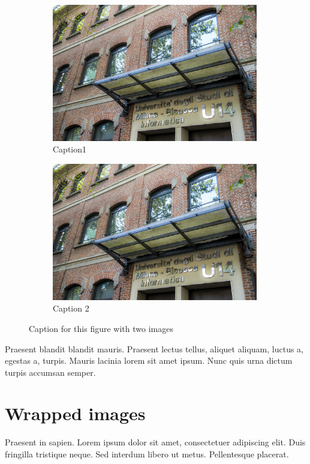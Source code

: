 \documentclass[a4paper, oneside]{book}
\begin{document}
\begin{figure}[h]
\begin{subfigure}{0.5\textwidth}
\includegraphics[width=0.9\linewidth, height=6cm]{u14} 
\caption{Caption1}
\label{fig:subim1}
\end{subfigure}
\begin{subfigure}{0.5\textwidth}
\includegraphics[width=0.9\linewidth, height=6cm]{u14}
\caption{Caption 2}
\label{fig:subim2}
\end{subfigure}

\caption{Caption for this figure with two images}
\label{fig:image2}
\end{figure}

Praesent blandit blandit mauris. Praesent lectus tellus, aliquet aliquam, luctus a, egestas a, turpis. Mauris lacinia lorem sit amet ipsum. Nunc quis urna dictum turpis accumsan semper.

\section{Wrapped images}

Praesent in sapien. Lorem ipsum dolor sit amet, consectetuer 
adipiscing elit. Duis fringilla tristique neque. Sed interdum 
libero ut metus. Pellentesque placerat.
\end{document}
